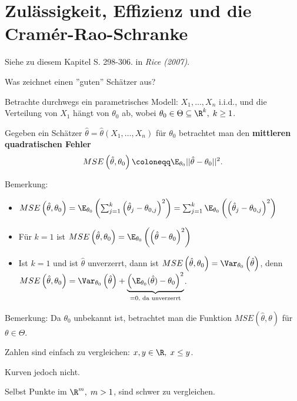 \documentclass{tstextbook}
\begin{document}
\section{Zulässigkeit, Effizienz und die Cramér-Rao-Schranke}

\begin{book}
	Siehe zu diesem Kapitel S. 298-306. in	\textit{Rice (2007)}.
\end{book}

Was zeichnet einen ''guten'' Schätzer aus?

Betrachte durchwegs ein parametrisches Modell:
$ X_1,\ldots,X_n $ i.i.d., und die Verteilung von $ X_1 $ hängt von $ \theta_0 $ ab, wobei $ \theta_0 \in \Theta \subseteq \R^k, \; k \ge 1 $.

Gegeben ein Schätzer $ \hat{\theta} = \hat{\theta}(X_1, \ldots, X_n) $ für $ \theta_0 $ betrachtet man den \textbf{mittleren quadratischen Fehler}  
	\[
	MSE\left(\hat{\theta},\theta_0\right) \coloneqq \E_{\theta_0} ||\hat{\theta}-\theta_0||^2.
	\]

\begin{remark}
	Bemerkung:
	\begin{itemize}
		\item $ MSE\left(\hat{\theta}, \theta_0\right) = \E_{\theta_0} \left(\sum_{j=1}^{k}\left(\hat{\theta}_j -\theta_{0,j}\right)^2\right) = \sum_{j=1}^{k} \E_{\theta_0}\left(\left(\hat{\theta}_j -\theta_{0,j}\right)^2\right)$
		\item Für $ k=1 $ ist $ MSE\left(\hat{\theta}, \theta_0\right) = \E_{\theta_0}\left(\left(\hat{\theta} -\theta_{0}\right)^2\right)$
		\item Ist $ k=1 $ und ist $ \hat{\theta} $ unverzerrt, dann ist $ MSE\left(\hat{\theta}, \theta_0\right) = \Var_{\theta_0}\left(\hat{\theta}\right) $, denn $ MSE\left(\hat{\theta}, \theta_0\right) = \Var_{\theta_0}\left(\hat{\theta}\right) + \underbrace{\left(\E_{\theta_0}(\hat{\theta})-\theta_0\right)^2}_{=0 \text{, da unverzerrt}} $.
	\end{itemize}
\end{remark}

\begin{remark}
	Bemerkung: Da $ \theta_0 $ unbekannt ist, betrachtet man die Funktion $ MSE\left(\hat{\theta}, \theta\right) $ für $ \theta\in\Theta $. 
	
	Zahlen sind einfach zu vergleichen: $ x,y \in \R, \; x\le y $. 
	
	Kurven jedoch nicht. 
	
	Selbst Punkte im $ \R^m,\; m>1 $, sind schwer zu vergleichen.
\end{remark}
\end{document}
